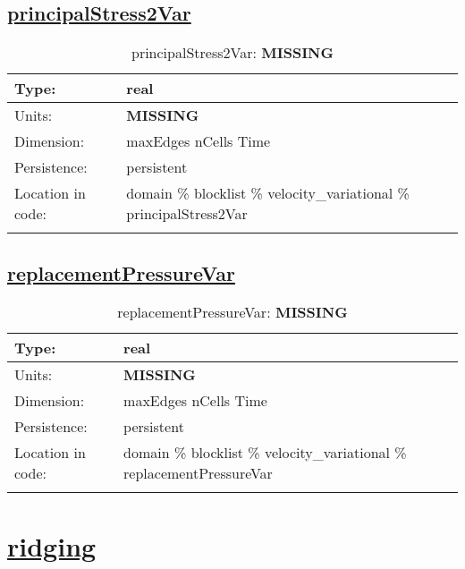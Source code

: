 \subsection[principalStress2Var]{\hyperref[sec:var_tab_velocity_variational]{principalStress2Var}}
\label{subsec:var_sec_velocity_variational_principalStress2Var}
\begin{center}
\begin{longtable}{| p{2.0in} | p{4.0in} |}
        \hline 
        Type: & real \\
        \hline 
        Units: & {\bf \color{red} MISSING} \\
        \hline 
        Dimension: & maxEdges nCells Time \\
        \hline 
        Persistence: & persistent \\
        \hline 
         Location in code: & domain \% blocklist \% velocity\_variational \% principalStress2Var \\
         \hline 
    \caption{principalStress2Var: {\bf \color{red} MISSING}}
\end{longtable}
\end{center}
\subsection[replacementPressureVar]{\hyperref[sec:var_tab_velocity_variational]{replacementPressureVar}}
\label{subsec:var_sec_velocity_variational_replacementPressureVar}
\begin{center}
\begin{longtable}{| p{2.0in} | p{4.0in} |}
        \hline 
        Type: & real \\
        \hline 
        Units: & {\bf \color{red} MISSING} \\
        \hline 
        Dimension: & maxEdges nCells Time \\
        \hline 
        Persistence: & persistent \\
        \hline 
         Location in code: & domain \% blocklist \% velocity\_variational \% replacementPressureVar \\
         \hline 
    \caption{replacementPressureVar: {\bf \color{red} MISSING}}
\end{longtable}
\end{center}
\section[ridging]{\hyperref[sec:var_tab_ridging]{ridging}}
\label{sec:var_sec_ridging}
